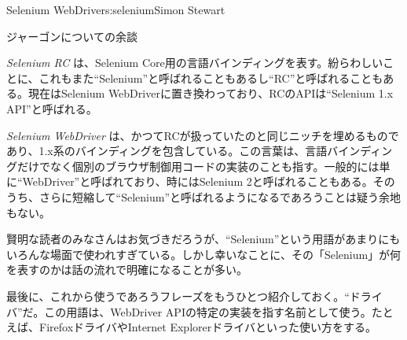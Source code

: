 \begin{aosachapter}{Selenium WebDriver}{s:selenium}{Simon Stewart}
\begin{aosasect1}{ジャーゴンについての余談}
\begin{aosaitemize}
  \item \emph{Selenium RC} は、Selenium Core用の言語バインディングを表す。紛らわしいことに、これもまた``Selenium''と呼ばれることもあるし``RC''と呼ばれることもある。現在はSelenium WebDriverに置き換わっており、RCのAPIは``Selenium 1.x API''と呼ばれる。

  \item \emph{Selenium WebDriver} は、かつてRCが扱っていたのと同じニッチを埋めるものであり、1.x系のバインディングを包含している。この言葉は、言語バインディングだけでなく個別のブラウザ制御用コードの実装のことも指す。一般的には単に``WebDriver''と呼ばれており、時にはSelenium 2と呼ばれることもある。そのうち、さらに短縮して``Selenium''と呼ばれるようになるであろうことは疑う余地もない。

\end{aosaitemize}

賢明な読者のみなさんはお気づきだろうが、``Selenium''という用語があまりにもいろんな場面で使われすぎている。しかし幸いなことに、その「Selenium」が何を表すのかは話の流れで明確になることが多い。

最後に、これから使うであろうフレーズをもうひとつ紹介しておく。``ドライバ''だ。この用語は、WebDriver APIの特定の実装を指す名前として使う。たとえば、FirefoxドライバやInternet Explorerドライバといった使い方をする。


\end{aosasect1}
\end{aosachapter}
